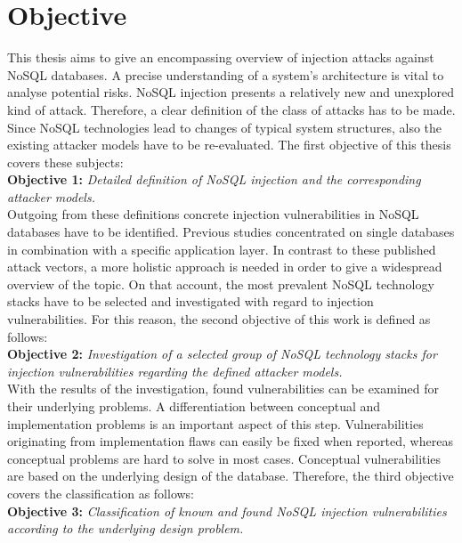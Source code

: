 \section{Objective}
\label{sec:objective}
This thesis aims to give an encompassing overview of injection attacks against NoSQL databases. A precise understanding of a system's architecture is vital to analyse potential risks. NoSQL injection presents a relatively new and unexplored kind of attack. Therefore, a clear definition of the class of attacks has to be made. Since NoSQL technologies lead to changes of typical system structures, also the existing attacker models have to be re-evaluated. The first objective of this thesis covers these subjects: \\

\textbf{Objective 1:} \textit{Detailed definition of NoSQL injection and the corresponding attacker models.} \\

Outgoing from these definitions concrete injection vulnerabilities in NoSQL databases have to be identified. Previous studies concentrated on single databases in combination with a specific application layer. In contrast to these published attack vectors, a more holistic approach is needed in order to give a widespread overview of the topic. On that account, the most prevalent NoSQL technology stacks have to be selected and investigated with regard to injection vulnerabilities. For this reason, the second objective of this work is defined as follows: \\

\textbf{Objective 2:} \textit{Investigation of a selected group of NoSQL technology stacks for injection vulnerabilities regarding the defined attacker models.} \\

With the results of the investigation, found vulnerabilities can be examined for their underlying problems. A differentiation between conceptual and implementation problems is an important aspect of this step. Vulnerabilities originating from implementation flaws can easily be fixed when reported, whereas conceptual problems are hard to solve in most cases. Conceptual vulnerabilities are based on the underlying design of the database. Therefore, the third objective covers the classification as follows: \\

\textbf{Objective 3:} \textit{Classification of known and found NoSQL injection vulnerabilities according to the underlying design problem.} \\


